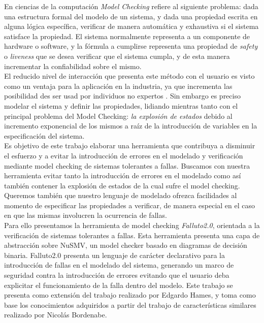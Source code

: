 \documentclass[titlepage, 12pt]{book}
\begin{document}
En ciencias de la computaci\'on \emph{Model Checking} refiere al siguiente problema: dada una estructura formal del modelo de un sistema, y dada una propiedad escrita en alguna l\'ogica espec\'ifica, verificar de manera autom\'atica y exhaustiva si el sistema satisface la propiedad. El sistema normalmente representa a un componente de hardware o software, y la f\'ormula a cumplirse representa una propiedad de \emph{safety} o \emph{liveness} que se desea verificar que el sistema cumpla, y de esta manera incrementar la confiabilidad sobre el mismo.\\

El reducido nivel de interacci\'on que presenta este m\'etodo con el usuario es visto como un ventaja para la aplicaci\'on en la industria, ya que incrementa las posibilidad des ser usad por individuos no expertos \cite{RuysBrinksma}. %
Sin embargo es preciso modelar el sistema y definir las propiedades, lidiando mientras tanto con el principal problema del Model Checking: \emph{la explosi\'on de estados} debido al incremento exponencial de los mismos a ra\'iz de la introducci\'on de variables en la especificaci\'on del sistema.\\


Es objetivo de este trabajo elaborar una herramienta que contribuya a disminuir el esfuerzo y a evitar la introducci\'on de errores en el modelado y verificaci\'on mediante model checking de sistemas tolerantes a fallas. Buscamos con nuestra herramienta evitar tanto la introducci\'on de errores en el modelado como as\'i tambi\'en contener la explosi\'on de estados de la cual sufre el model checking. Queremos tambi\'en que nuestro lenguaje de modelado ofrezca facilidades al momento de especificar las propiedades a verificar, de manera especial en el caso en que las mismas involucren la ocurrencia de fallas.\\

Para ello presentamos la herramienta de model checking \emph{Falluto2.0}, orientada a la verificaci\'on de sistemas tolerantes a fallas. Esta herramienta presenta una capa de abstracci\'on sobre NuSMV\cite{NuSMV}, un model checker basado en diagramas de decisi\'on binaria. Falluto2.0 presenta un lenguaje de car\'acter declarativo para la introducci\'on de fallas en el modelado del sistema, generando un marco de seguridad contra la introducci\'on de errores evitando que el usuario deba explicitar el funcionamiento de la falla dentro del modelo. Este trabajo se presenta como extensi\'on del trabajo realizado por Edgardo Hames\cite{Hames}, y toma como base los conocimientos adquiridos a partir del trabajo de caracter\'isticas similares realizado por Nicol\'as Bordenabe\cite{Bordenabe}.
\end{document}

